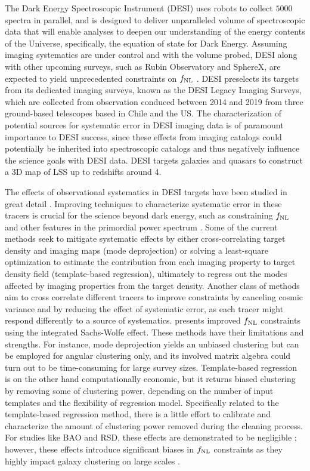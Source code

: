 The Dark Energy Spectroscopic Instrument (DESI) uses robots to collect $5000$ spectra in parallel, and is designed to deliver unparalleled volume of spectroscopic data that will enable analyses to deepen our understanding of the energy contents of the Universe, specifically, the equation of state for Dark Energy. Assuming imaging systematics are under control and with the volume probed, DESI along with other upcoming surveys, such as Rubin Observatory and SphereX, are expected to yield unprecedented constraints on $f_{\rm NL}$ \citep[see, e.g.,][]{Heinrich2022AAS...24020203H}. DESI preselects its targets from its dedicated imaging surveys, known as the DESI Legacy Imaging Surveys, which are collected from observation conduced between 2014 and 2019 from three ground-based telescopes based in Chile and the US. The characterization of potential sources for systematic error in DESI imaging data is of paramount importance to DESI success, since these effects from imaging catalogs could potentially be inherited into spectroscopic catalogs and thus negatively influence the science goals with DESI data. DESI targets galaxies and quasars to construct a 3D map of LSS up to redshifts around 4. 

The effects of observational systematics in DESI targets have been studied in great detail \cite[see, e.g.,][]{kitanidis2020imaging, zhou2021clustering, chaussidon2022angular}. Improving techniques to characterize systematic error in these tracers is crucial for the science beyond dark energy, such as constraining $f_{\rm NL}$ and other features in the primordial power spectrum \citep{beutler2019primordial}. Some of the current methods seek to mitigate systematic effects by either cross-correlating target density and imaging maps (mode deprojection) or solving a least-square optimization to estimate the contribution from each imaging property to target density field (template-based regression), ultimately to regress out the modes affected by imaging properties from the target density. Another class of methods aim to cross correlate different tracers to improve constraints by canceling cosmic variance and by reducing the effect of systematic error, as each tracer might respond differently to a source of systematics. \cite{giannantonio2014improved} presents improved $f_{\rm NL}$ constraints using the integrated Sachs-Wolfe effect. These methods have their limitations and strengths. For instance, mode deprojection yields an unbiased clustering but can be employed for angular clustering only, and its involved matrix algebra could turn out to be time-consuming for large survey sizes. Template-based regression is on the other hand computationally economic, but it returns biased clustering by removing some of clustering power, depending on the number of input templates and the flexibility of regression model. Specifically related to the template-based regression method, there is a little effort to calibrate and characterize the amount of clustering power removed during the cleaning process. For studies like BAO and RSD, these effects are demonstrated to be negligible \citep{merz2021clustering}; however, these effects introduce significant biases in $f_{\rm NL}$ constraints \citep{mueller2022primordial} as they highly impact galaxy clustering on large scales \citep{rezaie2021primordial}.  
 
